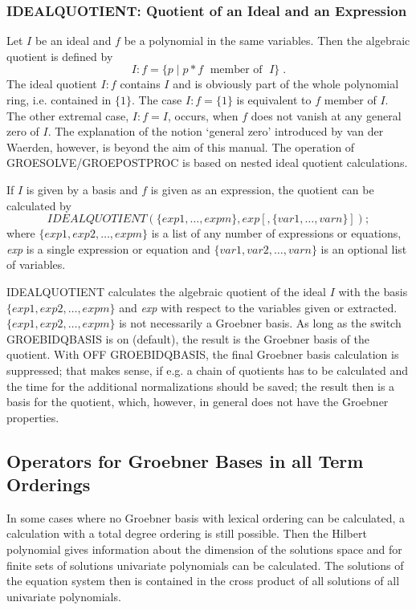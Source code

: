 \subsubsection{IDEALQUOTIENT: Quotient of an Ideal and an
Expression}
Let $I$ be an ideal and $f$ be a polynomial in the same
variables. Then the algebraic quotient is defined by
\[
I:f = \{ p \;| \; p * f \;\mbox{    member of }\; I\}\;.
\]
The ideal quotient $I:f$ contains $I$ and is obviously part of the
whole polynomial ring, i.e. contained in $\{1\}$. The case $I:f =
\{1\}$ is equivalent to $f$ member of  $I$. The other extremal case,
$I:f=I$, occurs, when $f$ does not vanish at any general zero of $I$.
The explanation of the notion `general zero' introduced by van der
Waerden, however, is beyond the aim of this manual. The operation
of GROESOLVE/GROEPOSTPROC is based on nested ideal quotient
calculations.

If $I$ is given by a basis and $f$ is given as an expression, the
quotient can be calculated by
\[
IDEALQUOTIENT (\{exp1, \ldots , expm\}, exp [,\{var1,
\ldots , varn\}]); \]
where $\{exp1, exp2, \ldots , expm\}$ is a list of any number of
expressions or equations, {\it exp} is a single expression or equation
and $\{var1, var2, \ldots , varn\}$ is an optional list of variables.

IDEALQUOTIENT calculates the algebraic quotient of the ideal $I$
with the basis  $\{exp1, exp2, \ldots , expm\}$ and {\it exp} with
respect to  the variables given or extracted.  $\{exp1, exp2, \ldots ,
expm\}$ is not necessarily a Groebner basis. As long as the switch
GROEBIDQBASIS is on (default), the result is the Groebner basis of
the quotient. With OFF GROEBIDQBASIS, the final Groebner basis
calculation is suppressed; that makes sense, if e.g. a chain of
quotients has to be calculated and the time for the additional
normalizations should be saved; the result then is a basis for the
quotient, which, however, in general does not have the Groebner
properties.

\subsection{Operators for Groebner Bases in all Term Orderings}
In some cases where no Groebner
basis with lexical ordering can be calculated, a calculation with a total
degree ordering is still possible. Then the Hilbert polynomial gives
information about the dimension of the solutions space and for finite
sets of solutions univariate polynomials can be calculated. The solutions
of the equation system then is contained in the cross product of all
solutions of all univariate polynomials. %
